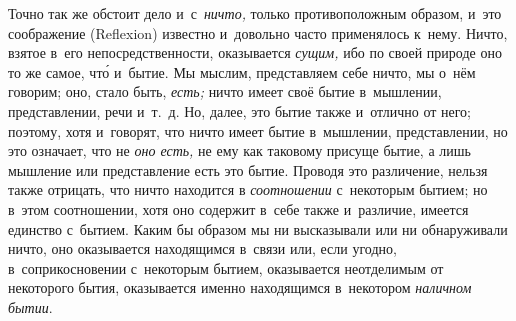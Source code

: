 Точно так же обстоит дело и~с~{\em ничто,} только противоположным образом,
и~это соображение (Reflexion) известно и~довольно часто применялось к~нему.
Ничто, взятое в~его непосредственности, оказывается {\em сущим,} ибо по своей
природе оно то же самое, чт\'{о} и~бытие. Мы мыслим, представляем себе ничто,
мы о~нём говорим; оно, стало быть, {\em есть;} ничто имеет своё бытие
в~мышлении, представлении, речи и~т.~д. Но, далее, это бытие также и~отлично от
него; поэтому, хотя и~говорят, что ничто имеет бытие в~мышлении, представлении,
но это означает, что не {\em оно есть,} не ему как таковому присуще бытие, а
лишь мышление или представление есть это бытие. Проводя это различение, нельзя
также отрицать, что ничто находится в {\em соотношении} с~некоторым бытием; но
в~этом соотношении, хотя оно содержит в~себе также и~различие, имеется единство
с~бытием. Каким бы образом мы ни высказывали или ни обнаруживали ничто, оно
оказывается находящимся в~связи или, если угодно, в~соприкосновении с~некоторым
бытием, оказывается неотделимым от некоторого бытия, оказывается именно
находящимся в~некотором {\em наличном бытии}.

